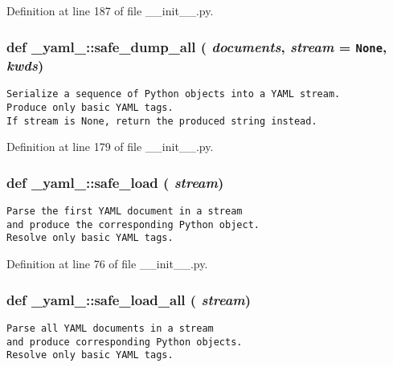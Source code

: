 Definition at line 187 of file \_\-\_\-init\_\-\_\-.py.
\subsubsection{\setlength{\rightskip}{0pt plus 5cm}def \_\-yaml\_\-::safe\_\-dump\_\-all ( {\em documents},  {\em stream} = {\tt None},  {\em kwds})}\label{namespace__yaml___ff09869491eeb74f6e49b551326947b3}




\footnotesize\begin{verbatim}
Serialize a sequence of Python objects into a YAML stream.
Produce only basic YAML tags.
If stream is None, return the produced string instead.
\end{verbatim}
\normalsize
 

Definition at line 179 of file \_\-\_\-init\_\-\_\-.py.
\subsubsection{\setlength{\rightskip}{0pt plus 5cm}def \_\-yaml\_\-::safe\_\-load ( {\em stream})}\label{namespace__yaml___9ee5536ba3f1d9d6322ccb2792620273}




\footnotesize\begin{verbatim}
Parse the first YAML document in a stream
and produce the corresponding Python object.
Resolve only basic YAML tags.
\end{verbatim}
\normalsize
 

Definition at line 76 of file \_\-\_\-init\_\-\_\-.py.
\subsubsection{\setlength{\rightskip}{0pt plus 5cm}def \_\-yaml\_\-::safe\_\-load\_\-all ( {\em stream})}\label{namespace__yaml___e08ef18d41e4428e42d9afa2347e1073}




\footnotesize\begin{verbatim}
Parse all YAML documents in a stream
and produce corresponding Python objects.
Resolve only basic YAML tags.
\end{verbatim}
\normalsize
 

